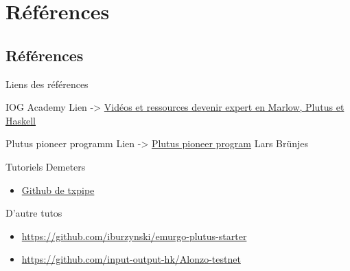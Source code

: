 \documentclass[presentation]{beamer}
\begin{document}
\section{Références}
\label{sec:orgb5b99b7}
\subsection{Références}
\label{sec:org141f723}
\begin{frame}[label={sec:orge80a8b7}]{Liens des références}
\begin{block}{IOG Academy}
Lien -> \href{https://www.youtube.com/@iogacademy/playlists}{Vidéos et ressources devenir expert en Marlow, Plutus et Haskell}
\end{block}

\begin{block}{Plutus pioneer programm}
Lien -> \href{https://www.youtube.com/@iogacademy/playlists?view=50\&sort=dd\&shelf\_id=3}{Plutus pioneer program} Lars Brünjes
\end{block}
\begin{block}{Tutoriels Demeters}
\begin{itemize}
\item \href{https://github.com/orgs/txpipe/repositories}{Github de txpipe}
\end{itemize}
\begin{block}{D'autre tutos}
\begin{itemize}
\item \url{https://github.com/iburzynski/emurgo-plutus-starter}
\item \url{https://github.com/input-output-hk/Alonzo-testnet}
\end{itemize}
\end{block}
\end{block}
\end{frame}
\end{document}

